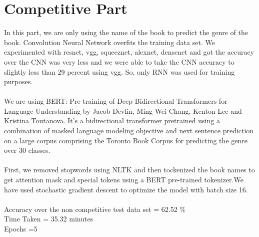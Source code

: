 \documentclass[11pt]{article}
\begin{document}
\section{Competitive Part}
In this part, we are only using the name of the book to predict the genre of the book. Convolution Neural Network overfits the training data set. We experimented with resnet, vgg, squeeznet, alexnet, densenet  and got the accuracy over the CNN was very less and we were able to take the CNN accuracy to slightly less than 29 percent using vgg. So, only RNN was used for training purposes. \\
\\
We are using  BERT: Pre-training of Deep Bidirectional Transformers for Language Understanding by Jacob Devlin, Ming-Wei Chang, Kenton Lee and Kristina Toutanova. It’s a bidirectional transformer pretrained using a combination of masked language modeling objective and next sentence prediction on a large corpus comprising the Toronto Book Corpus for predicting the genre over 30 classes. \\
\\
First, we removed stopwords using NLTK and then tockenized the book names to get attention mask and special tokens using a BERT pre-trained tokenizer.We have used stochastic gradient descent to optimize the model with batch size 16. \\
\\
Accuracy over the non competitive test data set = 62.52 \% \\
Time Taken = 35.32 minutes \\
Epochs =5
\end{document}
